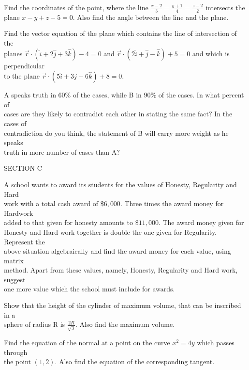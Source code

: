 \documentclass[14pt]{exam}
\begin{document}
\begin{questions}
	\question Find the coordinates of the point, where the line $\frac{x-2}{3}=\frac{y+1}{4}=\frac{z-2}{2}$ intersects the\\ plane $x-y+z-5=0$. Also find the angle between the line and the plane.

	\question Find the vector equation of the plane which contains the line of intersection of the\\ planes $\vec{r} \cdot (\hat{i}+2\hat{j}+3\hat{k})-4=0$ and $\vec{r} \cdot (2\hat{i}+\hat{j}-\hat{k})+5=0$ and which is perpendicular\\ to the plane $\vec{r} \cdot (5\hat{i}+3\hat{j}-6\hat{k})+8=0$.

	\question A speaks truth in $60\%$ of the cases, while B in $90\%$ of the cases. In what percent of\\ cases are they likely to contradict each other in stating the same fact$?$ In the cases of\\ contradiction do you think, the statement of B will carry more weight as he speaks\\ truth in more number of cases than A$?$\\

	\centerline{SECTION-C}

	\question A school wants to award its students for the values of Honesty, Regularity and Hard\\ work with a total cash award of $\$6,000$. Three times the award money for Hardwork\\ added to that given for honesty amounts to $\$11,000$. The award money given for\\ Honesty and Hard work together is double the one given for Regularity. Represent the\\ above situation algebraically and find the award money for each value, using matrix\\ method. Apart from these values, namely, Honesty, Regularity and Hard work, suggest\\ one more value which the school must include for awards.

	\question Show that the height of the cylinder of maximum volume, that can be inscribed in a\\ sphere of radius R is $\frac{2R}{\sqrt{3}}$. Also find the maximum volume.

	\question Find the equation of the normal at a point on the curve $x^2=4y$ which passes through\\ the point $(1,2)$. Also find the equation of the corresponding tangent.


\end{questions}
\end{document}
